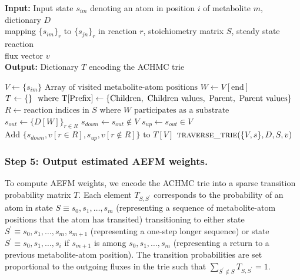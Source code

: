 \documentclass[12pt]{article}
\begin{document}
\begin{algorithm}
\caption{Depth-first construction of the ACHMC trie}\label{alg01:trie}
\hspace*{\algorithmicindent} \textbf{Input:} Input state $s_{im}$
denoting an atom in position $i$ of metabolite $m$, dictionary $D$ \\
\hspace*{\algorithmicindent} mapping $\{s_{im}\}_r$ to $\{s_{jn}\}_r$ in reaction $r$, stoichiometry matrix $S$, steady state reaction\\
\hspace*{\algorithmicindent} flux vector $v$\\
\hspace*{\algorithmicindent} \textbf{Output:} Dictionary $T$ encoding the ACHMC trie
\begin{algorithmic}[1]
    \State $V \gets \{s_{im}\} \text{ Array of visited metabolite-atom positions}$
    \State $W \gets V[\text{end}] \text{}$
    \State $T \gets \{\}\ \text{ where T[\text{Prefix}]} \gets \{\text{Children}, \text{ Children values}, \text{ Parent}, \text{ Parent values}\}$
    \State $R \gets \text{reaction indices in } S \text{ where } W \text{ participates as a substrate}$
    \State $s_{out} \gets \{D[W]\}_{r \in R}$
    \State $s_{down} \gets s_{out} \notin V$ 
    \State $s_{up} \gets s_{out} \in V$
    \State $\text{Add } \{s_{down}, v[r\in R], s_{up}, v[r\notin R]\} \text{ to } T[V]$
        \State $\textsc{traverse\_trie}(\{V, s\}, D, S, v)$
    \EndFor
\EndFunction
\end{algorithmic}
\end{algorithm}

\subsubsection*{Step 5: Output estimated AEFM weights.}

To compute AEFM weights, we encode the ACHMC trie into a sparse transition
probability matrix $T$. Each element $T_{S,S^\prime}$ corresponds to the
probability of an atom in state $S \equiv s_0, s_1, \ldots, s_m$
(representing a sequence of metabolite-atom positions that the atom has
transited) transitioning to either state $S^\prime \equiv s_0, s_1,
\ldots, s_m, s_{m+1}$ (representing a one-step longer sequence) or state
$S^\prime \equiv s_0, s_1, \ldots, s_i$ if $s_{m+1}$ is among $s_0, s_1,
\ldots, s_m$ (representing a return to a previous metabolite-atom
position). The transition probabilities are set proportional to the
outgoing fluxes in the trie such that $\sum_{S^{\prime}\notin S}
T_{S,S^{\prime}} = 1$.
\end{document}
